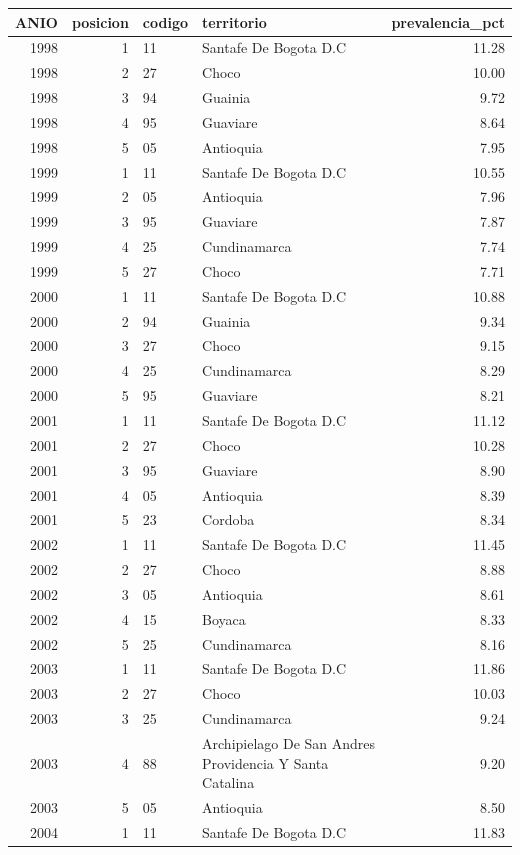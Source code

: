 \begin{tabular}{rrllr}
\toprule
ANIO & posicion & codigo & territorio & prevalencia\_pct \\
\midrule
1998 & 1 & 11 & Santafe De Bogota D.C & 11.28 \\
1998 & 2 & 27 & Choco & 10.00 \\
1998 & 3 & 94 & Guainia & 9.72 \\
1998 & 4 & 95 & Guaviare & 8.64 \\
1998 & 5 & 05 & Antioquia & 7.95 \\
1999 & 1 & 11 & Santafe De Bogota D.C & 10.55 \\
1999 & 2 & 05 & Antioquia & 7.96 \\
1999 & 3 & 95 & Guaviare & 7.87 \\
1999 & 4 & 25 & Cundinamarca & 7.74 \\
1999 & 5 & 27 & Choco & 7.71 \\
2000 & 1 & 11 & Santafe De Bogota D.C & 10.88 \\
2000 & 2 & 94 & Guainia & 9.34 \\
2000 & 3 & 27 & Choco & 9.15 \\
2000 & 4 & 25 & Cundinamarca & 8.29 \\
2000 & 5 & 95 & Guaviare & 8.21 \\
2001 & 1 & 11 & Santafe De Bogota D.C & 11.12 \\
2001 & 2 & 27 & Choco & 10.28 \\
2001 & 3 & 95 & Guaviare & 8.90 \\
2001 & 4 & 05 & Antioquia & 8.39 \\
2001 & 5 & 23 & Cordoba & 8.34 \\
2002 & 1 & 11 & Santafe De Bogota D.C & 11.45 \\
2002 & 2 & 27 & Choco & 8.88 \\
2002 & 3 & 05 & Antioquia & 8.61 \\
2002 & 4 & 15 & Boyaca & 8.33 \\
2002 & 5 & 25 & Cundinamarca & 8.16 \\
2003 & 1 & 11 & Santafe De Bogota D.C & 11.86 \\
2003 & 2 & 27 & Choco & 10.03 \\
2003 & 3 & 25 & Cundinamarca & 9.24 \\
2003 & 4 & 88 & Archipielago De San Andres Providencia Y Santa Catalina & 9.20 \\
2003 & 5 & 05 & Antioquia & 8.50 \\
2004 & 1 & 11 & Santafe De Bogota D.C & 11.83 \\

\end{tabular}
